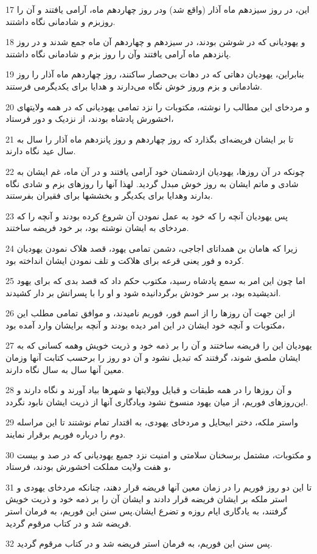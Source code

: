 \par 17 این، در روز سیزدهم ماه آذار (واقع شد) ودر روز چهاردهم ماه، آرامی یافتند و آن را روزبزم و شادمانی نگاه داشتند.
\par 18 و یهودیانی که در شوشن بودند، در سیزدهم و چهاردهم آن ماه جمع شدند و در روز پانزدهم ماه آرامی یافتند وآن را روز بزم و شادمانی نگاه داشتند.
\par 19 بنابراین، یهودیان دهاتی که در دهات بی‌حصار ساکنند، روز چهاردهم ماه آذار را روز شادمانی و بزم وروز خوش نگاه می‌دارند و هدایا برای یکدیگرمی فرستند.
\par 20 و مردخای این مطالب را نوشته، مکتوبات را نزد تمامی یهودیانی که در همه ولایتهای اخشورش پادشاه بودند، از نزدیک و دور فرستاد،
\par 21 تا بر ایشان فریضه‌ای بگذارد که روز چهاردهم و روز پانزدهم ماه آذار را سال به سال عید نگاه دارند.
\par 22 چونکه در آن روزها، یهودیان ازدشمنان خود آرامی یافتند و در آن ماه، غم ایشان به شادی و ماتم ایشان به روز خوش مبدل گردید. لهذا آنها را روزهای بزم و شادی نگاه بدارند وهدایا برای یکدیگر و بخششها برای فقیران بفرستند.
\par 23 پس یهودیان آنچه را که خود به عمل نمودن آن شروع کرده بودند و آنچه را که مردخای به ایشان نوشته بود، بر خود فریضه ساختند.
\par 24 زیرا که هامان بن همداتای اجاجی، دشمن تمامی یهود، قصد هلاک نمودن یهودیان کرده و فور یعنی قرعه برای هلاکت و تلف نمودن ایشان انداخته بود.
\par 25 اما چون این امر به سمع پادشاه رسید، مکتوب حکم داد که قصد بدی که برای یهود اندیشیده بود، بر سر خودش برگردانیده شود و او را با پسرانش بر دار کشیدند.
\par 26 از این جهت آن روزها را از اسم فور، فوریم نامیدند، و موافق تمامی مطلب این مکتوبات و آنچه خود ایشان در این امر دیده بودند و آنچه برایشان وارد آمده بود،
\par 27 یهودیان این را فریضه ساختند و آن را بر ذمه خود و ذریت خویش وهمه کسانی که به ایشان ملصق شوند، گرفتند که تبدیل نشود و آن دو روز را برحسب کتابت آنها وزمان معین آنها سال به سال نگاه دارند.
\par 28 و آن روزها را در همه طبقات و قبایل وولایتها و شهرها بیاد آورند و نگاه دارند و این‌روزهای فوریم، از میان یهود منسوخ نشود ویادگاری آنها از ذریت ایشان نابود نگردد.
\par 29 واستر ملکه، دختر ابیحایل و مردخای یهودی، به اقتدار تمام نوشتند تا این مراسله دوم را درباره فوریم برقرار نمایند.
\par 30 و مکتوبات، مشتمل برسخنان سلامتی و امنیت نزد جمیع یهودیانی که در صد و بیست و هفت ولایت مملکت اخشورش بودند، فرستاد،
\par 31 تا این دو روز فوریم را در زمان معین آنها فریضه قرار دهند، چنانکه مردخای یهودی و استر ملکه بر ایشان فریضه قرار دادند و ایشان آن را بر ذمه خود و ذریت خویش گرفتند، به یادگاری ایام روزه و تضرع ایشان.پس سنن این فوریم، به فرمان استر فریضه شد و در کتاب مرقوم گردید.
\par 32 پس سنن این فوریم، به فرمان استر فریضه شد و در کتاب مرقوم گردید.
 
